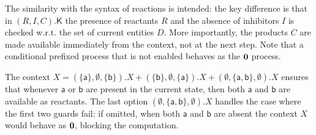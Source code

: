 

The similarity with the syntax of reactions is intended: the key difference is that in $(R,I,C).\mathsf{K}$ the presence of reactants $R$ and the absence of inhibitors $I$ is checked w.r.t. the set of current entities $D$.
More importantly, the products $C$ are made available immediately from the context, not at the next step.
Note that a conditional prefixed process that is not enabled behaves as the $\mathbf{0}$ process.





\begin{example}
The context 
\(
X = (\{\mathsf{a}\},\emptyset,\{\mathsf{b}\}).X + (\{\mathsf{b}\},\emptyset,\{\mathsf{a}\}).X + (\emptyset,\{\mathsf{a},\mathsf{b}\},\emptyset).X
\)
ensures that whenever $\mathsf{a}$ or $\mathsf{b}$ are present in the current state, then both $\mathsf{a}$ and $\mathsf{b}$ are available as reactants.
The last option $(\emptyset,\{\mathsf{a},\mathsf{b}\},\emptyset).X$ handles the case where the first two guards fail: if omitted, when both $\mathsf{a}$ and $\mathsf{b}$ are absent the context $X$ would behave as $\mathbf{0}$, blocking the computation.
\end{example}
